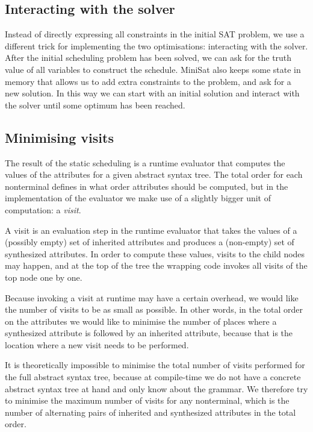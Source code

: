 \documentclass{llncs}
\begin{document}
\subsection{Interacting with the solver}
Instead of directly expressing all constraints in the initial SAT problem, we use a different trick for implementing the two optimisations: interacting with the solver. After the initial scheduling problem has been solved, we can ask for the truth value of all variables to construct the schedule. MiniSat also keeps some state in memory that allows us to add extra constraints to the problem, and ask for a new solution. In this way we can start with an initial solution and interact with the solver until some optimum has been reached.

\subsection{Minimising visits} \label{sect:minimising}
The result of the static scheduling is a runtime evaluator that computes the values of the attributes for a given abstract syntax tree. The total order for each nonterminal defines in what order attributes should be computed, but in the implementation of the evaluator we make use of a slightly bigger unit of computation: a \emph{visit}.

A visit is an evaluation step in the runtime evaluator that takes the values of a (possibly empty) set of inherited attributes and produces a (non-empty) set of synthesized attributes. In order to compute these values, visits to the child nodes may happen, and at the top of the tree the wrapping code invokes all visits of the top node one by one.

Because invoking a visit at runtime may have a certain overhead, we would like the number of visits to be as small as possible. In other words, in the total order on the attributes we would like to minimise the number of places where a synthesized attribute is followed by an inherited attribute, because that is the location where a new visit needs to be performed.

It is theoretically impossible to minimise the total number of visits performed for the full abstract syntax tree, because at compile-time we do not have a concrete abstract syntax tree at hand and only know about the grammar. We therefore try to minimise the maximum number of visits for any nonterminal, which is the number of alternating pairs of inherited and synthesized attributes in the total order.
\end{document}
